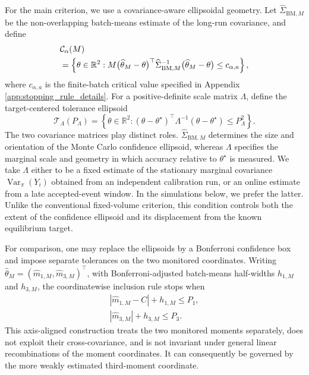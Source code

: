 \documentclass[showpacs,amsmath,amssymb,twocolumn,prx,superscriptaddress,10pt,aps,nofootinbib]{revtex4-2}
\begin{document}
For the main criterion, we use a covariance-aware ellipsoidal geometry. Let $\widehat{\Sigma}_{\mathrm{BM},M}$ be the non-overlapping batch-means estimate of the long-run covariance, and define
\begin{align}
    &\mathcal{C}_\alpha(M)\notag\\
    &=
    \left\{
        \theta\in\mathbb{R}^2:
        M
        \bigl(\widehat{\theta}_M-\theta\bigr)^\top
        \widehat{\Sigma}_{\mathrm{BM},M}^{-1}
        \bigl(\widehat{\theta}_M-\theta\bigr)
        \leq c_{\alpha,a}
    \right\},
    \label{eq:confidence_ellipsoid}
\end{align}
where $c_{\alpha,a}$ is the finite-batch critical value specified in Appendix \ref{app:stopping_rule_details}. For a positive-definite scale matrix $\Lambda$, define the target-centered tolerance ellipsoid
\begin{equation}
    \mathcal{T}_\Lambda(P_\Lambda)
    =
    \left\{
        \theta\in\mathbb{R}^2:
        (\theta-\theta^\star)^\top
        \Lambda^{-1}
        (\theta-\theta^\star)
        \leq P_\Lambda^2
    \right\}.
    \label{eq:tolerance_ellipsoid}
\end{equation}
The two covariance matrices play distinct roles. $\widehat{\Sigma}_{\mathrm{BM},M}$ determines the size and orientation of the Monte Carlo confidence ellipsoid, whereas $\Lambda$ specifies the marginal scale and geometry in which accuracy relative to
$\theta^\star$ is measured. We take $\Lambda$ either to be a fixed estimate of the stationary marginal covariance $\operatorname{Var}_{\pi}(Y_i)$ obtained from an independent calibration run, or an online estimate from a late accepted-event window. In the simulations below, we prefer the latter. Unlike the conventional fixed-volume criterion, this condition controls both the extent of the confidence ellipsoid and its displacement from the known equilibrium target.


For comparison, one may replace the ellipsoids by a Bonferroni confidence box and impose separate tolerances on the two monitored coordinates. Writing $\widehat{\theta}_M=(\widehat{m}_{1,M},\widehat{m}_{3,M})^\top$, with Bonferroni-adjusted batch-means half-widths $h_{1,M}$ and $h_{3,M}$, the coordinatewise inclusion rule stops when
\begin{align}
\label{eq:coordinatewise_inclusion}
    \left|\widehat{m}_{1,M}-C\right|+h_{1,M}\leq P_1, \\
    \left|\widehat{m}_{3,M}\right|+h_{3,M}\leq P_3.
\end{align}
This axis-aligned construction treats the two monitored moments separately, does not exploit their cross-covariance, and is not invariant under general linear recombinations of the moment coordinates. It can consequently be governed by the more weakly estimated third-moment coordinate. 
\end{document}
